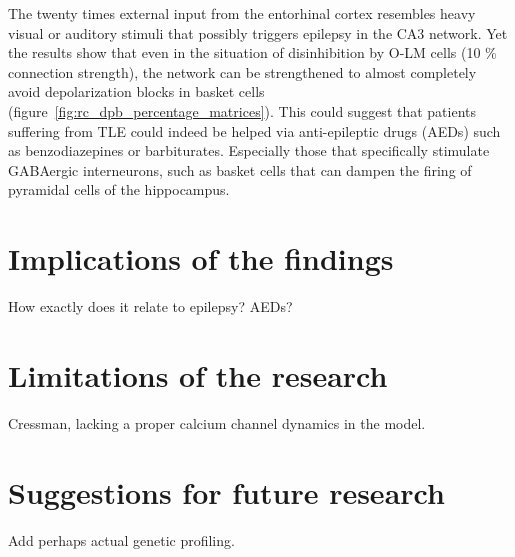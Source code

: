 The twenty times external input from the entorhinal cortex resembles heavy visual or auditory stimuli that possibly triggers
epilepsy in the CA3 network. Yet the results show that even in the situation of disinhibition by O-LM cells (10 \% connection strength),
the network can be strengthened to almost completely avoid depolarization blocks in basket cells (figure~\ref{fig:rc_dpb_percentage_matrices}).
This could suggest that patients suffering from TLE could indeed be helped via anti-epileptic drugs (AEDs) such as benzodiazepines or barbiturates.
Especially those that specifically stimulate GABAergic interneurons, such as basket cells that can  dampen the firing of pyramidal cells of the hippocampus.

\section{Implications of the findings}
How exactly does it relate to epilepsy?
AEDs?

\section{Limitations of the research}
Cressman, lacking a proper calcium channel dynamics in the model.

\section{Suggestions for future research}
Add perhaps actual genetic profiling.